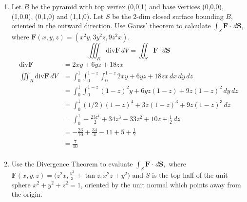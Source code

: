 \documentclass{article}
\newcommand{\divt}{\text{div}}
\begin{document}
\begin{enumerate}
        \newpage
        \item Let $B$ be the pyramid with top vertex (0,0,1) and base vertices (0,0,0), (1,0,0), (0,1,0) and (1,1,0). Let $S$ be the 2-dim closed surface bounding $B$, oriented in the outward direction. Use Gauss' theorem to calculate $\displaystyle \int_S \boldsymbol F \cdot \, d \boldsymbol S$, where $\boldsymbol F(x,y,z) = (x^2y,3y^2z,9z^2x).$
            \[\iiint_R \divt \boldsymbol F \, dV = \iint_S \boldsymbol F \cdot d\boldsymbol S\]
            \begin{align*}
                \divt \boldsymbol F &= 2xy + 6yz + 18zx \\
                \iiint_R \divt \boldsymbol F \, dV &= \int_0^1 \int_0^{1-z} \int_0^{1-z} 2xy + 6yz + 18zx \, dx \, dy \, dz \\
                &= \int_0^1 \int_0^{1-z} (1-z)^2y + 6yz(1-z) + 9z(1-z)^2 \, dy \, dz \\
                &= \int_0^1 (1/2)(1-z)^4 + 3z(1-z)^3 + 9z(1-z)^3 \, dz \\
                &= \int_0^1 -\frac{23z^4}{2} + 34z^3 - 33z^2 + 10z + \frac{1}{2} \, dz \\
                &= -\frac{23}{10} + \frac{34}{4} - 11 + 5 + \frac{1}{2} \\
                &= \frac{7}{10} \\ 
            \end{align*}
            \newpage
\item Use the Divergence Theorem to evaluate $\displaystyle \int_S \boldsymbol F \cdot \, d \boldsymbol S,$ where $\displaystyle \boldsymbol F (x,y,z) = \bigg(z^2 x, \frac{y^3}{3} + \tan z, x^2z+y^2 \bigg)$ and $S$ is the top half of the unit sphere $x^2 + y^2 + z^2 = 1$, oriented by the unit normal which points away from the origin.
    

\end{enumerate}
\end{document}
